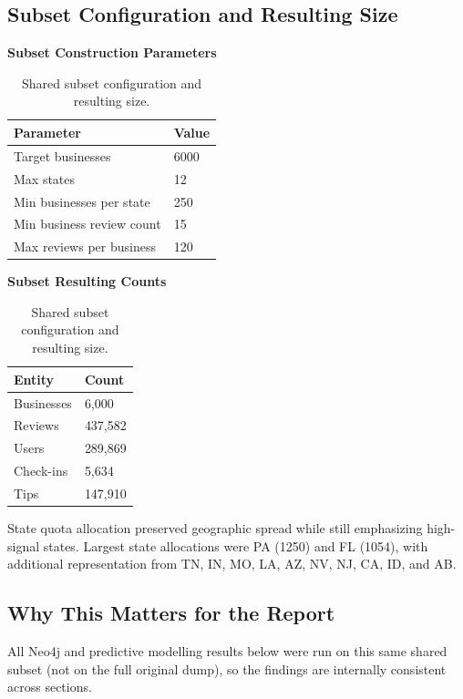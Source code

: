 \documentclass[11pt,a4paper]{article}
\begin{document}
\subsection*{Subset Configuration and Resulting Size}
\begin{table}[H]
\centering
\begin{minipage}[t]{0.48\textwidth}
\centering
\small
\textbf{Subset Construction Parameters}\\[4pt]
\begin{tabular}{ll}
\toprule
\textbf{Parameter} & \textbf{Value} \\
\midrule
Target businesses & 6000 \\
Max states & 12 \\
Min businesses per state & 250 \\
Min business review count & 15 \\
Max reviews per business & 120 \\
\bottomrule
\end{tabular}
\end{minipage}
\hfill
\begin{minipage}[t]{0.48\textwidth}
\centering
\small
\textbf{Subset Resulting Counts}\\[4pt]
\begin{tabular}{ll}
\toprule
\textbf{Entity} & \textbf{Count} \\
\midrule
Businesses & 6,000 \\
Reviews & 437,582 \\
Users & 289,869 \\
Check-ins & 5,634 \\
Tips & 147,910 \\
\bottomrule
\end{tabular}
\end{minipage}
\caption{Shared subset configuration and resulting size.}
\end{table}

State quota allocation preserved geographic spread while still emphasizing high-signal states. Largest state allocations were PA (1250) and FL (1054), with additional representation from TN, IN, MO, LA, AZ, NV, NJ, CA, ID, and AB.

\subsection*{Why This Matters for the Report}
All Neo4j and predictive modelling results below were run on this same shared subset (not on the full original dump), so the findings are internally consistent across sections.
\end{document}
